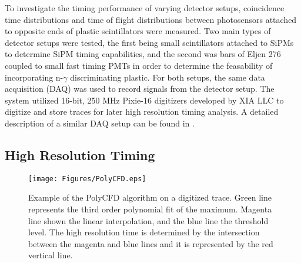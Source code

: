 To  investigate the timing performance of varying detector setups, coincidence time distributions and time of flight distributions between photosensors attached to opposite ends of plastic scintillators were measured. Two main types of detector setups were tested, the first being small scintillators attached to SiPMs to determine SiPM timing capabilities, and the second was bars of Eljen 276 coupled to small fast timing PMTs in order to determine the feasability of incorporating n-$\gamma$  discriminating plastic. For both setups, the same data acquisition (DAQ) was used to record signals from the detector setup. The system utilized 16-bit, 250 MHz Pixie-16 digitizers developed by XIA LLC \cite{XIA} to digitize and store traces for later high resolution timing analysis. A detailed description of a similar DAQ setup can be found in \cite{PAULAUSKAS201422}.



\subsection{High Resolution Timing}
\begin{figure}[bt]
\centering
\texttt{[image: Figures/PolyCFD.eps]}
\caption{Example of the PolyCFD algorithm on a digitized trace. Green line represents the third order polynomial fit of the maximum. Magenta line shown the linear interpolation, and the blue line the threshold level. The high resolution time is determined by the intersection between the magenta and blue lines and it is represented by the red vertical line.}
\label{fig:PolyCFD}
\end{figure}

